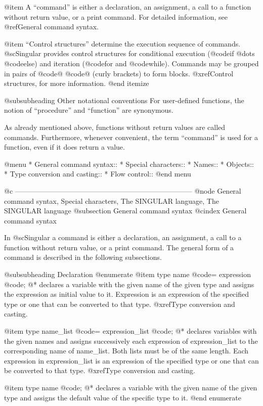 @item
A ``command'' is either a declaration, an assignment, a call to a
function without return value, or a print command.  For detailed
information, see @ref{General command syntax}.

@item
``Control structures'' determine the execution sequence of commands.
@sc{Singular} provides control structures for conditional execution
(@code{if} @dots{} @code{else}) and iteration (@code{for} and
@code{while}).  Commands may be grouped in pairs of @code{@{} @code{@}}
(curly brackets) to form blocks.  @xref{Control structures}, for
more information.
@end itemize

@subsubheading Other notational conventions
For user-defined functions, the notion of ``procedure'' and
``function'' are synonymous.

As already mentioned above, functions without return values are called
commands.  Furthermore, whenever convenient, the term ``command'' is
used for a function, even if it does return a value.

@menu
* General command syntax::
* Special characters::
* Names::
* Objects::
* Type conversion and casting::
* Flow control::
@end menu

@c ---------------------------------------------------------------------------
@node General command syntax, Special characters, The SINGULAR language, The SINGULAR language
@subsection General command syntax
@cindex General command syntax

In @sc{Singular} a command is either a declaration, an assignment, a
call to a function without return value, or a print command. The general
form of a command is described in the following subsections.

@subsubheading Declaration
@enumerate
@item type name @code{=} expression @code{;}
@* declares a variable with the given name of the given type and assigns
the expression as initial value to it.  Expression is an expression of
the specified type or one that can be converted to that type.
@xref{Type conversion and casting}.

@item type name_list @code{=} expression_list @code{;}
@* declares variables with the given names and assigns successively each
expression of expression_list to the corresponding name of
name_list.  Both lists must be of the same length.  Each expression in
expression_list is an expression of the specified type or one that can
be converted to that type.  @xref{Type conversion and casting}.

@item type name @code{;}
@* declares a variable with the given name of the given type and assigns
the default value of the specific type to it.
@end enumerate

